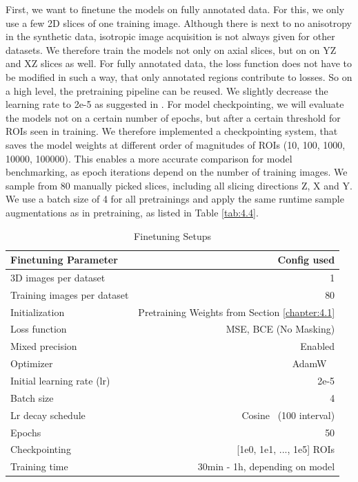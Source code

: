 First, we want to finetune the models on fully annotated data. For this, we only use a few 2D slices of one training image. Although there is next to no anisotropy in the synthetic data, isotropic image acquisition is not always given for other datasets. We therefore train the models not only on axial slices, but on on YZ and XZ slices as well. For fully annotated data, the loss function does not have to be modified in such a way, that only annotated regions contribute to losses. So on a high level, the pretraining pipeline can be reused. We slightly decrease the learning rate to 2e-5 as suggested in \cite{lee2022mediarharmonydatacentricmodelcentric}. For model checkpointing, we will evaluate the models not on a certain number of epochs, but after a certain threshold for ROIs seen in training. We therefore implemented a checkpointing system, that saves the model weights at different order of magnitudes of ROIs (10, 100, 1000, 10000, 100000). This enables a more accurate comparison for model benchmarking, as epoch iterations depend on the number of training images. We sample from 80 manually picked slices, including all slicing directions Z, X and Y. We use a batch size of 4 for all pretrainings and apply the same runtime sample augmentations as in pretraining, as listed in Table \ref{tab:4.4}. 

\begin{table}[ht]
\centering
\caption{Finetuning Setups}
\begin{tabular}{l r}
\hline\hline
\textbf{Finetuning Parameter} & \textbf{Config used} \\
\hline
3D images per dataset                           &  1\\
Training images per dataset                     &  80                              \\                    
Initialization                                  &  Pretraining Weights from Section \ref{chapter:4.1}             \\
Loss function                                   &  MSE, BCE (No Masking)                        \\
Mixed precision                                 &  Enabled  \\
Optimizer                                       &     AdamW \                   \\
Initial learning rate (lr)                      &    2e-5                 \\
Batch size                                      &  4  \\
Lr decay schedule                               &    Cosine \ (100 interval) \\
Epochs                                          &  50                               \\
Checkpointing                                   &  [1e0, 1e1, ..., 1e5] ROIs                               \\
\midrule
Training time                                   &  30min - 1h, depending on model                       \\
\hline
\end{tabular}
\end{table}

